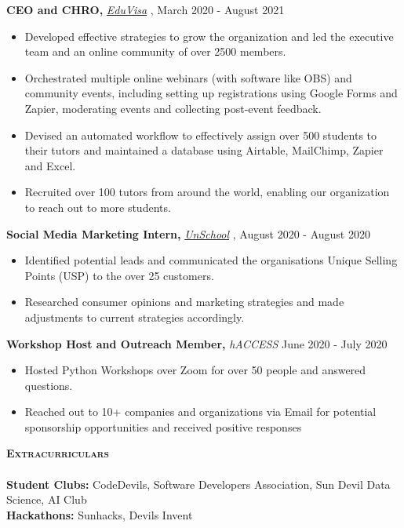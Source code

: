 \documentclass[a4paper]{article}
\newcommand{\lineunder} {
    \vspace*{-8pt} \\
    \hspace*{-18pt} \hrulefill \\
}
\newcommand{\header} [1] {
    {\hspace*{-15pt}\vspace*{3pt} \textsc{#1}}
    \vspace*{-6pt} \lineunder
}
\begin{document}
\textbf{CEO and CHRO, }\textit{{\href{https://myeduvisa.org/}{EduVisa}} \faExternalLink},   \hfill March 2020 - August 2021\\
\vspace{-3mm}
\begin{itemize} \itemsep 1pt
	\item Developed effective strategies to grow the organization and led the executive team and an online community of over 2500 members.
	\item Orchestrated multiple online webinars (with software like OBS) and community events, including setting up registrations using Google Forms and Zapier, moderating events and collecting post-event feedback.
	\item Devised an automated workflow to effectively assign over 500 students to their tutors and maintained a database using Airtable, MailChimp, Zapier and Excel.
	\item Recruited over 100 tutors from around the world, enabling our organization to reach out to more students.
\end{itemize}

\textbf{Social Media Marketing Intern, }\textit{{\href{https://www.unschool.in/}{UnSchool}} \faExternalLink},  \hfill August 2020 - August 2020\\
\vspace{-3mm}
\begin{itemize} \itemsep 1pt
	\item Identified potential leads and communicated the organisation\textquotesingle{}s Unique Selling Points (USP) to the over 25 customers.
	\item Researched consumer opinions and marketing strategies and made adjustments to current strategies accordingly.
\end{itemize}

\textbf{Workshop Host and Outreach Member, }\textit{hACCESS}  \hfill June 2020 - July 2020\\
\vspace{-3mm}
\begin{itemize} \itemsep 1pt
	\item Hosted Python Workshops over Zoom for over 50 people and answered questions.
	\item Reached out to 10+ companies and organizations via Email for potential sponsorship opportunities and received positive responses
\end{itemize}

\vspace{-2mm}


\header{\textbf{Extracurriculars}}


\textbf{Student Clubs:} CodeDevils, Software Developers Association, Sun Devil Data Science, AI Club \\
\textbf{Hackathons:} Sunhacks, Devils Invent



\vspace{-50mm}
    
\end{document}
